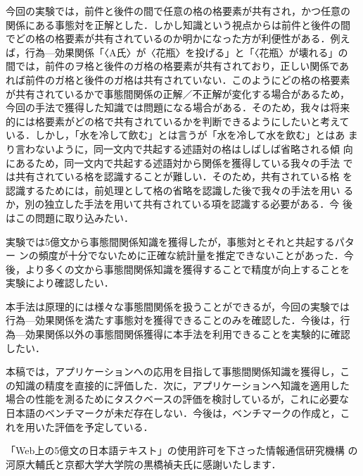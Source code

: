 \documentclass[japanese]{jnlp_1.4}
\begin{document}
今回の実験では，前件と後件の間で任意の格の格要素が共有され，かつ任意の
関係にある事態対を正解とした．しかし知識という視点からは前件と後件の間
でどの格の格要素が共有されているのか明かになった方が利便性がある．例え
ば，行為—効果関係「〈A氏〉が〈花瓶〉を投げる」と「〈花瓶〉が壊れる」の
間では，前件のヲ格と後件のガ格の格要素が共有されており，正しい関係であ
れば前件のガ格と後件のガ格は共有されていない．このようにどの格の格要素
が共有されているかで事態間関係の正解／不正解が変化する場合があるため，
今回の手法で獲得した知識では問題になる場合がある．そのため，我々は将来
的には格要素がどの格で共有されているかを判断できるようにしたいと考えて
いる．しかし，「水を冷して飲む」とは言うが「水を冷して水を飲む」とはあ
まり言わないように，同一文内で共起する述語対の格はしばしば省略される傾
向にあるため，同一文内で共起する述語対から関係を獲得している我々の手法
では共有されている格を認識することが難しい．そのため，共有されている格
を認識するためには，前処理として格の省略を認識した後で我々の手法を用い
るか，別の独立した手法を用いて共有されている項を認識する必要がある．今
後はこの問題に取り込みたい．

実験では5億文から事態間関係知識を獲得したが，事態対とそれと共起するパター
ンの頻度が十分でないために正確な統計量を推定できないことがあった．今
後，より多くの文から事態間関係知識を獲得することで精度が向上することを
実験により確認したい．

本手法は原理的には様々な事態間関係を扱うことができるが，今回の実験では
行為—効果関係を満たす事態対を獲得できることのみを確認した．今後は，行
為—効果関係以外の事態間関係獲得に本手法を利用できることを実験的に確認
したい．

本稿では，アプリケーションへの応用を目指して事態間関係知識を獲得し，こ
の知識の精度を直接的に評価した．次に，アプリケーションへ知識を適用した
場合の性能を測るためにタスクベースの評価を検討しているが，これに必要な
日本語のベンチマークが未だ存在しない．今後は，ベンチマークの作成と，こ
れを用いた評価を予定している．





\acknowledgment
「Web上の5億文の日本語テキスト」の使用許可を下さった情報通信研究機構
の河原大輔氏と京都大学大学院の黒橋禎夫氏に感謝いたします．
\end{document}
